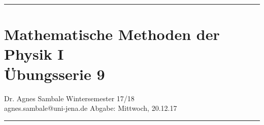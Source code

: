 \documentclass[a4paper,fleqn, 10pt]{article}
\begin{document}
	\pagestyle{empty}

	\hrule
	\section*{\centering Mathematische Methoden der Physik I \\ Übungsserie 9}
	\medskip
	Dr. Agnes Sambale \hfill Wintersemester 17/18\\
	agnes.sambale@uni-jena.de \hfill Abgabe: Mittwoch, 20.12.17
	\bigskip
	\hrule
	\bigskip
	\bigskip

	\atiShowSolutionsfalse

	
	
	
	
	
	
	
	
	
	
	


\end{document}
